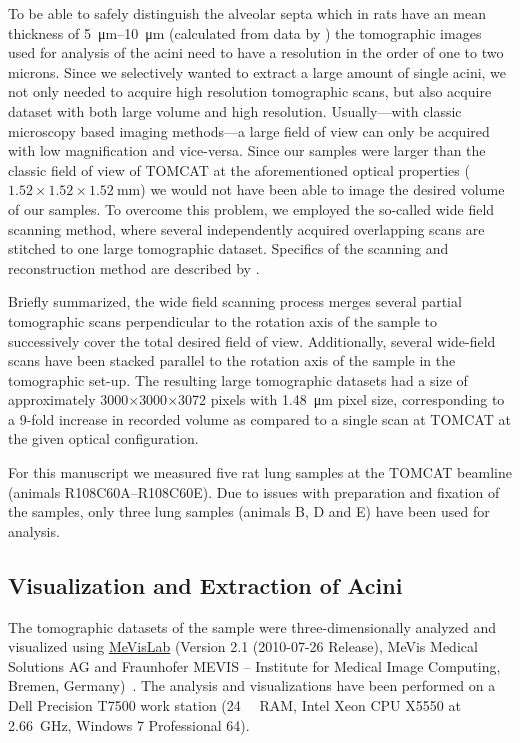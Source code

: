 \documentclass[twoside,paper=a4,abstract=true,english,DIV=calc]{scrartcl}
\begin{document}
To be able to safely distinguish the alveolar septa which in rats have an mean thickness of \SIrange{5}{10}{\micro\meter} (calculated from data by \citet{Burri1974}) the tomographic images used for analysis of the acini need to have a resolution in the order of one to two microns.
Since we selectively wanted to extract a large amount of single acini, we not only needed to acquire high resolution tomographic scans, but also acquire dataset with both large volume and high resolution.
Usually---with classic microscopy based imaging methods---a large field of view can only be acquired with low magnification and vice-versa.
Since our samples were larger than the classic field of view of TOMCAT at the aforementioned optical properties (\(1.52\times1.52\times\SI{1.52}{\milli\meter}\)) we would not have been able to image the desired volume of our samples.
To overcome this problem, we employed the so-called wide field scanning method, where several independently acquired overlapping scans are stitched to one large tomographic dataset.
Specifics of the scanning and reconstruction method are described by \citet{Haberthuer2010a}.

Briefly summarized, the wide field scanning process merges several partial tomographic scans perpendicular to the rotation axis of the sample to successively cover the total desired field of view.
Additionally, several wide-field scans have been stacked parallel to the rotation axis of the sample in the tomographic set-up.
The resulting large tomographic datasets had a size of approximately 3000\(\times\)3000\(\times\)3072 pixels with \SI{1.48}{\micro\meter} pixel size, corresponding to a 9-fold increase in recorded volume as compared to a single scan at TOMCAT at the given optical configuration.

For this manuscript we measured five rat lung samples at the TOMCAT beamline (animals R108C60A--R108C60E).
Due to issues with preparation and fixation of the samples, only three lung samples (animals B, D and E) have been used for analysis.

\subsection{Visualization and Extraction of Acini}
The tomographic datasets of the sample were three-dimensionally analyzed and visualized using \href{http://mevislab.de}{MeVisLab} (Version 2.1 (2010-07-26 Release), MeVis Medical Solutions AG and Fraunhofer MEVIS -- Institute for Medical Image Computing, Bremen, Germany)~\cite{Bitter2007}.
The analysis and visualizations have been performed on a Dell Precision T7500 work station (\SI{24}{\giga\byte} RAM, Intel Xeon CPU X5550 at \SI{2.66}{\giga\hertz}, Windows 7 Professional \SI{64}{\bit}).
\end{document}
